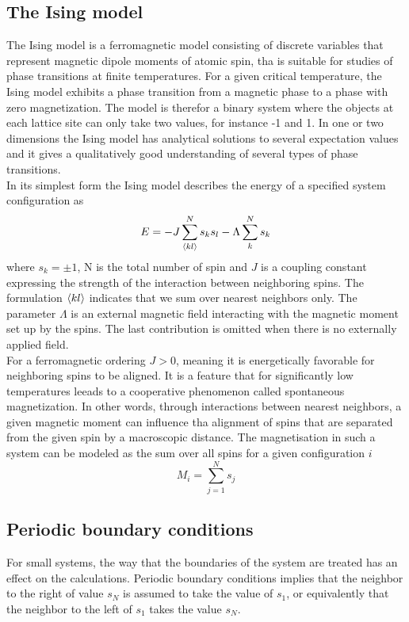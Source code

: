 \documentclass[%
reprint,nofootinbib,
amsmath,amssymb,
aps,
]{revtex4-1}
\begin{document}
\subsection{The Ising model} \noindent 
The Ising model is a ferromagnetic model consisting of discrete variables that represent magnetic dipole moments of atomic spin, tha is suitable for studies of phase transitions at finite temperatures. For a given critical temperature, the Ising model exhibits a phase transition from a magnetic phase to a phase with zero magnetization. The model is therefor a binary system where the objects at each lattice site can only take two values, for instance -1 and 1. In one or two dimensions the Ising model has analytical solutions to several expectation values and it gives a qualitatively good understanding of several types of phase transitions. \\ \indent 
In its simplest form the Ising model describes the energy of a specified system configuration as  
\begin{equation}\label{isemodel}
	E = -J\sum_{\expval{kl}}^{N}s_ks_l -\Lambda \sum_{k}^{N} s_k
\end{equation}
where $s_k = \pm 1$, N is the total number of spin and $J$ is a coupling constant expressing the strength of the interaction between neighboring spins. The formulation $\expval{kl}$ indicates that we sum over nearest neighbors only. The parameter $\Lambda$ is an external magnetic field interacting with the magnetic moment set up by the spins. The last contribution is omitted when there is no externally applied field.\\ \indent 
For a ferromagnetic ordering $J> 0$, meaning it is energetically favorable for neighboring spins to be aligned. It is a feature that for significantly low temperatures leeads to a cooperative phenomenon called spontaneous magnetization. In other words, through interactions between nearest neighbors, a given magnetic moment can influence tha alignment of spins that are separated from the given spin by a macroscopic distance. The magnetisation in such a system can be modeled as the sum over all spins for a given configuration $i$
\begin{equation}\label{mf}
M_i = \sum_{j = 1}^{N}s_j
\end{equation}

\subsection{Periodic boundary conditions} \noindent 
For small systems, the way that the boundaries of the system are treated has an effect on the calculations. Periodic boundary conditions implies that the neighbor to the right of value $s_N$ is assumed to take the value of $s_1$, or equivalently that the neighbor to the left of $s_1$ takes the value $s_N$. 
\end{document}
